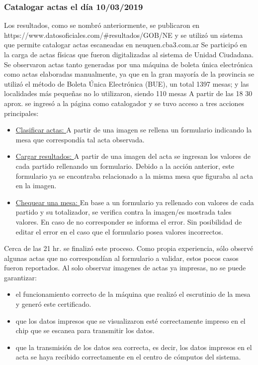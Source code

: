 \subsubsection{Catalogar actas el día 10/03/2019}
Los resultados, como se nombró anteriormente, se publicaron en https://www.datosoficiales.com/#resultados/GOB/NE y se utilizó un sistema que permite catalogar actas escaneadas en neuquen.cba3.com.ar \newline
Se participó en la carga de actas físicas que fueron digitalizadas al sistema de Unidad Ciudadana. Se observaron actas tanto generadas por una máquina de boleta única electrónica como actas elaboradas manualmente, ya que en la gran mayoría de la provincia se utilizó el método de Boleta Única Electrónica (BUE), un total 1397 mesas; y las localidades más pequeñas no lo utilizaron, siendo 110 mesas \cite{eleccionesNeuquenBUE} \newline
A partir de las 18 30 aprox. se ingresó a la página como catalogador y se tuvo acceso a tres acciones principales: 

\begin{itemize}
    \item \underline{Clasificar actas: }A partir de una imagen se rellena un formulario indicando la mesa que correspondía tal acta observada.
    \item \underline{Cargar resultados: }A partir de una imagen del acta se ingresan los valores de cada partido rellenando un formulario. Debido a la acción anterior, este formulario ya se encontraba relacionado a la misma mesa que figuraba al acta en la imagen.
    \item \underline{Chequear una mesa: }En base a un formulario ya rellenado con valores de cada partido y su totalizador, se verifica contra la imagen/es mostrada tales valores. En caso de no corresponder se informa el error. Sin posibilidad de editar el error en el caso que el formulario posea valores incorrectos.
\end{itemize}
Cerca de las 21 hr. se finalizó este proceso. Como propia experiencia, sólo observé algunas actas que no correspondían al formulario a validar, estos pocos casos fueron reportados. 
Al solo observar imagenes de actas ya impresas, no se puede garantizar:
\begin{itemize}
    \item el funcionamiento correcto de la máquina que realizó el escrutinio de la mesa y generó este certificado.
    \item que los datos impresos que se visualizaron esté correctamente impreso en el chip que se escanea para transmitir los datos.
    \item que la transmisión de los datos sea correcta, es decir, los datos impresos  en el acta se haya recibido correctamente en el centro de cómputos del sistema.
\end{itemize}

